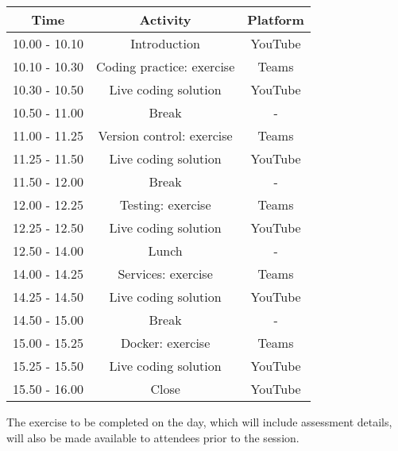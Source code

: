 \documentclass{article}
\begin{document}
\begin{table}[h!]
    \centering
    \begin{tabular}{c|c|c}
         Time & Activity & Platform  \\
         \hline
         10.00 - 10.10 & Introduction & YouTube \\
         10.10 - 10.30 & Coding practice: exercise & Teams \\
         10.30 - 10.50 & Live coding solution & YouTube \\
         10.50 - 11.00 & Break & - \\
         11.00 - 11.25 & Version control: exercise & Teams \\
         11.25 - 11.50 & Live coding solution & YouTube \\
         11.50 - 12.00 & Break & - \\
         12.00 - 12.25 & Testing: exercise & Teams \\
         12.25 - 12.50 & Live coding solution & YouTube \\
         12.50 - 14.00 & Lunch & - \\
         14.00 - 14.25 & Services: exercise & Teams \\
         14.25 - 14.50 & Live coding solution & YouTube \\
         14.50 - 15.00 & Break & - \\
         15.00 - 15.25 & Docker: exercise & Teams \\
         15.25 - 15.50 & Live coding solution & YouTube \\
         15.50 - 16.00 & Close & YouTube \\
         \hline
    \end{tabular}
\end{table}

The exercise to be completed on the day, which will include assessment details, will also be made available to attendees prior to the session.
\end{document}
